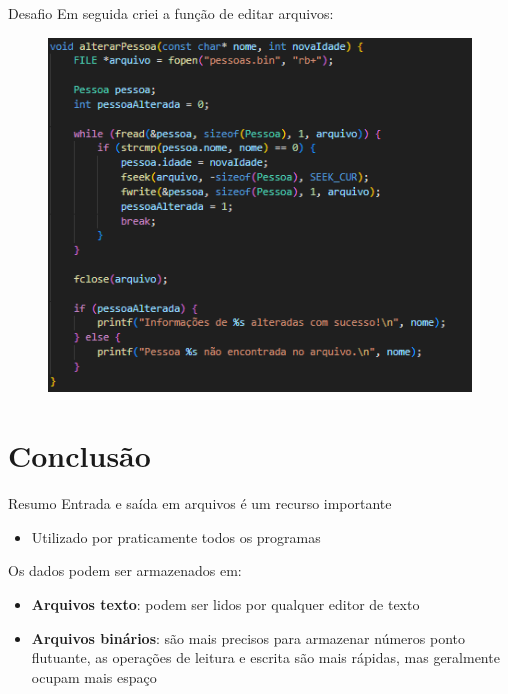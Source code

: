 \begin{frame}{Desafio}
Em seguida criei a função de editar arquivos:
\begin{figure}
    \centering
    \includegraphics[width=0.75\linewidth]{figuras/Codbin3.png}
\end{figure}
\end{frame}

\section{Conclusão}

\begin{frame}{Resumo}
    Entrada e saída em arquivos é um recurso importante
    \begin{itemize}
        \item Utilizado por praticamente todos os programas
    \end{itemize}
    Os dados podem ser armazenados em:
    \begin{itemize}
        \item \textbf{Arquivos texto}: podem ser lidos por qualquer editor de texto
        \item \textbf{Arquivos binários}: são mais precisos para armazenar números ponto flutuante, as operações de leitura e escrita são mais rápidas, mas
geralmente ocupam mais espaço
    \end{itemize}
\end{frame}


